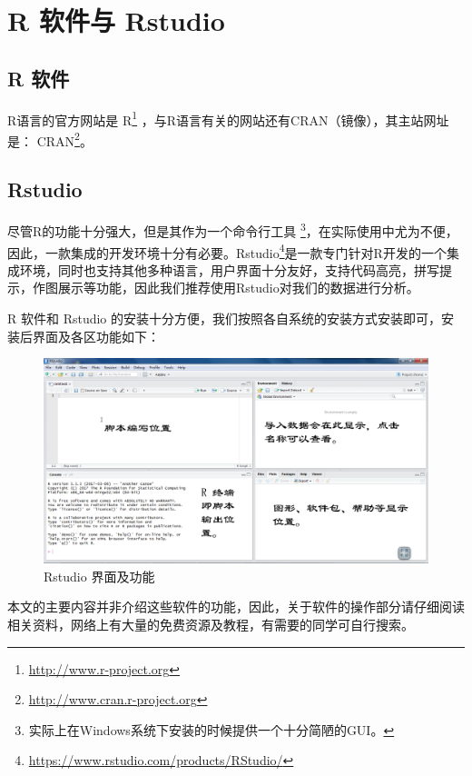 \documentclass[
]{krantz}
\renewcommand{\href}[2]{#2\footnote{\url{#1}}}
\begin{document}
\cleardoublepage

\mainmatter

\hypertarget{intro}{%
\chapter{R 软件与 Rstudio}\label{intro}}

\hypertarget{rsoft}{%
\section{R 软件}\label{rsoft}}

R语言的官方网站是 \href{http://www.r-project.org}{R} ，与R语言有关的网站还有CRAN（镜像），其主站网址是： \href{http://www.cran.r-project.org}{CRAN}。

\hypertarget{rstudiosoft}{%
\section{Rstudio}\label{rstudiosoft}}

尽管R的功能十分强大，但是其作为一个命令行工具 \footnote{实际上在Windows系统下安装的时候提供一个十分简陋的GUI。}，在实际使用中尤为不便，因此，一款集成的开发环境十分有必要。\href{https://www.rstudio.com/products/RStudio/}{Rstudio}是一款专门针对R开发的一个集成环境，同时也支持其他多种语言，用户界面十分友好，支持代码高亮，拼写提示，作图展示等功能，因此我们推荐使用Rstudio对我们的数据进行分析。

R 软件和 Rstudio 的安装十分方便，我们按照各自系统的安装方式安装即可，安装后界面及各区功能如下：

\begin{figure}
\includegraphics[width=4.55in]{images/rstudio} \caption{Rstudio 界面及功能}\label{fig:unnamed-chunk-2}
\end{figure}

本文的主要内容并非介绍这些软件的功能，因此，关于软件的操作部分请仔细阅读相关资料，网络上有大量的免费资源及教程，有需要的同学可自行搜索。
\end{document}
